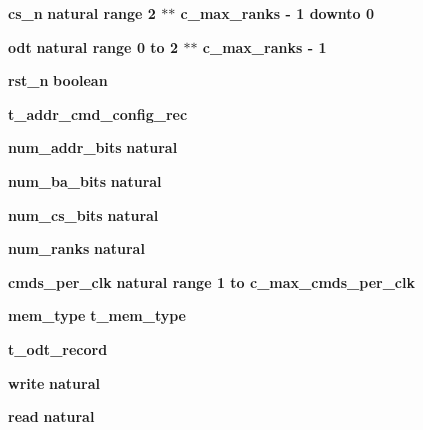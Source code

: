 \begin{DoxyCompactItemize}
\item 
{\bf cs\+\_\+n} {\bfseries {\bfseries \textcolor{comment}{natural}\textcolor{vhdlchar}{ }\textcolor{vhdlchar}{ }\textcolor{vhdlchar}{ }\textcolor{keywordflow}{range}\textcolor{vhdlchar}{ }\textcolor{vhdlchar}{ } \textcolor{vhdldigit}{2} \textcolor{vhdlchar}{$\ast$}\textcolor{vhdlchar}{$\ast$}\textcolor{vhdlchar}{ }\textcolor{vhdlchar}{ }\textcolor{vhdlchar}{ }{\bfseries {\bf c\+\_\+max\+\_\+ranks}} \textcolor{vhdlchar}{-\/}\textcolor{vhdlchar}{ } \textcolor{vhdldigit}{1} \textcolor{vhdlchar}{ }\textcolor{keywordflow}{downto}\textcolor{vhdlchar}{ }\textcolor{vhdlchar}{ } \textcolor{vhdldigit}{0} \textcolor{vhdlchar}{ }}} 
\item 
{\bf odt} {\bfseries {\bfseries \textcolor{comment}{natural}\textcolor{vhdlchar}{ }\textcolor{vhdlchar}{ }\textcolor{vhdlchar}{ }\textcolor{keywordflow}{range}\textcolor{vhdlchar}{ }\textcolor{vhdlchar}{ } \textcolor{vhdldigit}{0} \textcolor{vhdlchar}{ }\textcolor{keywordflow}{to}\textcolor{vhdlchar}{ }\textcolor{vhdlchar}{ } \textcolor{vhdldigit}{2} \textcolor{vhdlchar}{$\ast$}\textcolor{vhdlchar}{$\ast$}\textcolor{vhdlchar}{ }\textcolor{vhdlchar}{ }\textcolor{vhdlchar}{ }{\bfseries {\bf c\+\_\+max\+\_\+ranks}} \textcolor{vhdlchar}{-\/}\textcolor{vhdlchar}{ } \textcolor{vhdldigit}{1} \textcolor{vhdlchar}{ }}} 
\item 
{\bf rst\+\_\+n} {\bfseries {\bfseries \textcolor{comment}{boolean}\textcolor{vhdlchar}{ }}} 
\item 
{\bf t\+\_\+addr\+\_\+cmd\+\_\+config\+\_\+rec} {\bfseries  }
\item 
{\bf num\+\_\+addr\+\_\+bits} {\bfseries {\bfseries \textcolor{comment}{natural}\textcolor{vhdlchar}{ }}} 
\item 
{\bf num\+\_\+ba\+\_\+bits} {\bfseries {\bfseries \textcolor{comment}{natural}\textcolor{vhdlchar}{ }}} 
\item 
{\bf num\+\_\+cs\+\_\+bits} {\bfseries {\bfseries \textcolor{comment}{natural}\textcolor{vhdlchar}{ }}} 
\item 
{\bf num\+\_\+ranks} {\bfseries {\bfseries \textcolor{comment}{natural}\textcolor{vhdlchar}{ }}} 
\item 
{\bf cmds\+\_\+per\+\_\+clk} {\bfseries {\bfseries \textcolor{comment}{natural}\textcolor{vhdlchar}{ }\textcolor{vhdlchar}{ }\textcolor{vhdlchar}{ }\textcolor{keywordflow}{range}\textcolor{vhdlchar}{ }\textcolor{vhdlchar}{ } \textcolor{vhdldigit}{1} \textcolor{vhdlchar}{ }\textcolor{keywordflow}{to}\textcolor{vhdlchar}{ }\textcolor{vhdlchar}{ }\textcolor{vhdlchar}{ }\textcolor{vhdlchar}{ }{\bfseries {\bf c\+\_\+max\+\_\+cmds\+\_\+per\+\_\+clk}} \textcolor{vhdlchar}{ }}} 
\item 
{\bf mem\+\_\+type} {\bfseries {\bfseries {\bfseries {\bf t\+\_\+mem\+\_\+type}} \textcolor{vhdlchar}{ }}} 
\item 
{\bf t\+\_\+odt\+\_\+record} {\bfseries  }
\item 
{\bf write} {\bfseries {\bfseries \textcolor{comment}{natural}\textcolor{vhdlchar}{ }}} 
\item 
{\bf read} {\bfseries {\bfseries \textcolor{comment}{natural}\textcolor{vhdlchar}{ }}} 
\end{DoxyCompactItemize}


